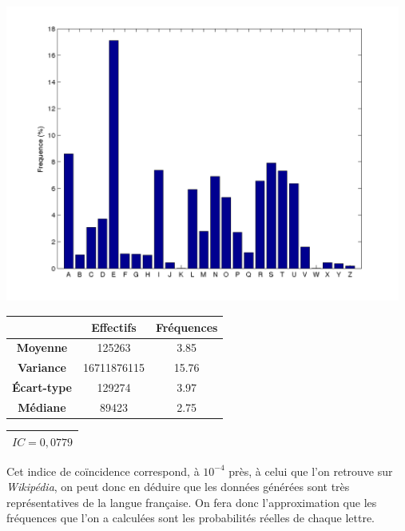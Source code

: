 \documentclass[a4paper, titlepage]{livret}
\begin{document}
\begin{minipage}[c]{.9\linewidth}
\includegraphics[width=13cm]{img/LettreFreqTexte.png}
\label{fig1}
\end{minipage}

\begin{center}
\begin{tabular}{|c|c|c|}
	\hline
	& \textbf{Effectifs} & \textbf{Fréquences}\\
	\hline
	\textbf{Moyenne} &  125263 &  3.85\\
	\hline
	\textbf{Variance} &  16711876115 &  15.76\\
	\hline
	\textbf{Écart-type} &  129274 &  3.97\\
	\hline
	\textbf{Médiane} &  89423 &  2.75\\
	\hline
\end{tabular}
\label{tab5}
\end{center}

\begin{center}
\begin{tabular}{|c|}
\hline
\textbf{$IC = 0,0779$}\\
\hline
\end{tabular}
\label{tab6}
\end{center}

Cet indice de coïncidence correspond, à $10^{-4}$ près, à celui que l'on retrouve sur \emph{Wikipédia}, on peut donc en déduire que les données générées sont très représentatives de la langue française.
On fera donc l'approximation que les fréquences que l'on a calculées sont les probabilités réelles de chaque lettre.
\end{document}
